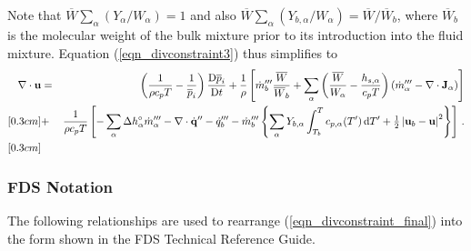 \noindent Note that $\overline{W} \sum_\alpha (Y_\alpha/W_\alpha) = 1$ and also $\overline{W} \sum_\alpha (Y_{b,\alpha}/W_\alpha) = \overline{W}/\overline{W}_b$,
where $\overline{W}_b$ is the molecular weight of the bulk mixture prior to its introduction into the fluid mixture.  Equation (\ref{eqn_divconstraint3}) thus simplifies to
\begin{eqnarray}
\label{eqn_divconstraint_final}
\nabla\cdot\mathbf{u}  &=& \left(\frac{1}{\rho c_p T}  -  \frac{1}{\overline{p}_i}\right) \frac{\mbox{D}\overline{p}_i}{\mbox{D} t} + \frac{1}{\rho} \left[ \dot{m}_b^{{\prime\prime\prime}} \frac{\overline{W}}{\overline{W}_b} +  \sum_\alpha \left( \frac{\overline{W}}{W_\alpha} - \frac{h_{s,\alpha}}{c_p T} \right)  \left(  \dot{m}_\alpha^{{\prime\prime\prime}}
- \nabla\cdot\mathbf{J}_{\alpha} \right) \right] \nonumber \\ [0.3cm]
&+&  \frac{1}{\rho c_p T} \left[ - \sum_\alpha \Delta h^\circ_\alpha \dot{m}_\alpha^{{\prime\prime\prime}} - \nabla\cdot \dot{\mathbf{q}}^{\prime\prime} - \dot{q}_b^{\prime\prime\prime} -\dot{m}_{b}^{{\prime\prime\prime}} \left\{\sum_\alpha Y_{b,\alpha} \int_{T_b}^{T} c_{p,\alpha}(T^\prime) \,\mbox{d}T^\prime + \mbox{$\frac{1}{2}$}\left|\mathbf{u}_b-\mathbf{u}\right|^2 \right\} \right] \,\mbox{.} \nonumber\\ [0.3cm]
\end{eqnarray}


\subsubsection{FDS Notation}
\label{fds_notation}

The following relationships are used to rearrange (\ref{eqn_divconstraint_final}) into the form shown in the FDS Technical Reference Guide.

